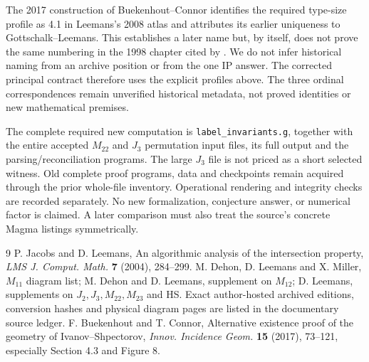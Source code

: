 \documentclass[11pt,a4paper]{article}
\begin{document}
The 2017 construction of Buekenhout--Connor identifies the required
type-size profile as 4.1 in Leemans's 2008 atlas and attributes its
earlier uniqueness to Gottschalk--Leemans. This establishes a later
name but, by itself, does not prove the same numbering in the 1998
chapter cited by \cite{JL}. We do not infer historical naming from
an archive position or from the one IP answer. The corrected principal contract
therefore uses the explicit profiles above. The three ordinal
correspondences remain unverified historical metadata, not proved
identities or new mathematical premises.

The complete required new computation is
\texttt{label\_invariants.g}, together with the entire accepted
$M_{22}$ and $J_3$ permutation input files, its full output and the
parsing/reconciliation programs. The large $J_3$ file is not priced
as a short selected witness. Old complete proof programs, data and
checkpoints remain acquired through the prior whole-file inventory.
Operational rendering and integrity checks are recorded separately.
No new formalization, conjecture answer, or numerical factor is
claimed. A later comparison must also treat the source's concrete
Magma listings symmetrically.

\small

\normalsize
\begin{thebibliography}{9}
 P. Jacobs and D. Leemans,
An algorithmic analysis of the intersection property,
\emph{LMS J. Comput. Math.} \textbf{7} (2004), 284--299.
 M. Dehon, D. Leemans and X. Miller, $M_{11}$ diagram
list; M. Dehon and D. Leemans, supplement on $M_{12}$; D. Leemans,
supplements on $J_2,J_3,M_{22},M_{23}$ and HS.
Exact author-hosted archived editions, conversion hashes and
physical diagram pages are listed in the documentary source ledger.
 F. Buekenhout and T. Connor,
Alternative existence proof of the geometry of Ivanov--Shpectorov,
\emph{Innov. Incidence Geom.} \textbf{15} (2017), 73--121,
especially Section 4.3 and Figure 8.
\end{thebibliography}
\end{document}
